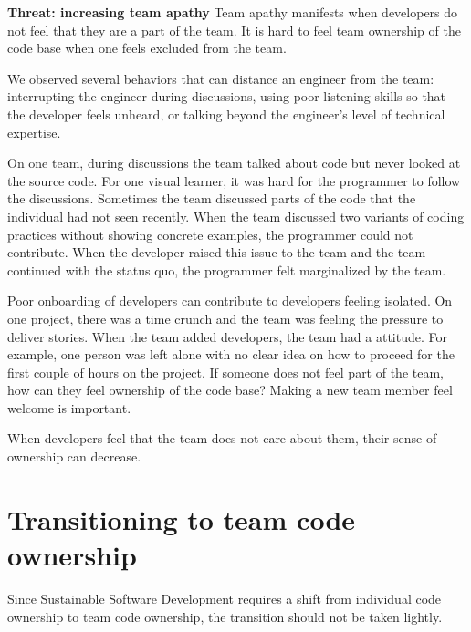\textbf{Threat: increasing team apathy}
Team apathy manifests when developers do not feel that they are a part of the team. It is hard to feel team ownership of the code base when one feels excluded from the team.

We observed several behaviors that can distance an engineer from the team: interrupting the engineer during discussions, using poor listening skills so that the developer feels unheard, or talking beyond the engineer's level of technical expertise. 

On one team, during discussions the team talked about code but never looked at the source code. For one visual learner, it was hard for the programmer to follow the discussions. Sometimes the team discussed parts of the code that the individual had not seen recently. When the team discussed two variants of coding practices without showing concrete examples, the programmer could not contribute. When the developer raised this issue to the team and the team continued with the status quo, the programmer felt marginalized by the team.

Poor onboarding of developers can contribute to developers feeling isolated. On one project, there was a time crunch and the team was feeling the pressure to deliver stories. When the team added developers, the team had a  attitude. For example, one person was left alone with no clear idea on how to proceed for the first couple of hours on the project. If someone does not feel part of the team, how can they feel ownership of the code base? Making a new team member feel welcome is important.



When developers feel that the team does not care about them, their sense of ownership can decrease.
\section{Transitioning to team code ownership}
\label{Transitioning}
Since Sustainable Software Development requires a shift from individual code ownership to team code ownership, the transition should not be taken lightly. 


